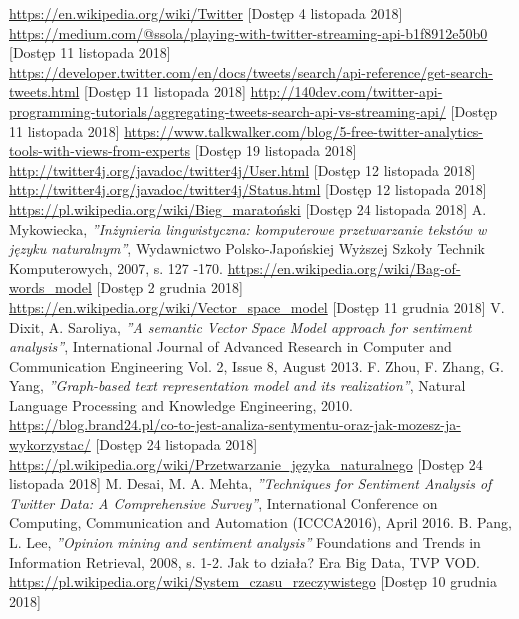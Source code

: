 \printbibliography
\clearpage
\begin{thebibliography}{99}
		\bibitem{[1]} 
		\url{https://en.wikipedia.org/wiki/Twitter} [Dostęp 4 listopada 2018]
		\bibitem{[2]}
		\url{https://medium.com/@ssola/playing-with-twitter-streaming-api-b1f8912e50b0} [Dostęp 11 listopada 2018]
		\bibitem{[3]}
		\url{https://developer.twitter.com/en/docs/tweets/search/api-reference/get-search-tweets.html} [Dostęp 11 listopada 2018]
		\bibitem{[4]}
		\url{http://140dev.com/twitter-api-programming-tutorials/aggregating-tweets-search-api-vs-streaming-api/} [Dostęp 11 listopada 2018]
		\bibitem{[5]}
		\url{https://www.talkwalker.com/blog/5-free-twitter-analytics-tools-with-views-from-experts} [Dostęp 19 listopada 2018]
		\bibitem{[6]}
		\url{http://twitter4j.org/javadoc/twitter4j/User.html} [Dostęp 12 listopada 2018]
		\bibitem{[7]}
		\url{http://twitter4j.org/javadoc/twitter4j/Status.html} [Dostęp 12 listopada 2018]
		\bibitem{[8]}
		\url{https://pl.wikipedia.org/wiki/Bieg_maratoński} [Dostęp 24 listopada 2018]
		\bibitem{[9]}
		A. Mykowiecka, \textit{''Inżynieria lingwistyczna: komputerowe przetwarzanie tekstów w języku naturalnym''}, Wydawnictwo Polsko-Japońskiej Wyższej Szkoły Technik Komputerowych, 2007, s. 127 -170.
		\bibitem{[10]}
		\url{https://en.wikipedia.org/wiki/Bag-of-words_model} [Dostęp 2 grudnia 2018]
		\bibitem{[11]}
		\url{https://en.wikipedia.org/wiki/Vector_space_model} [Dostęp 11 grudnia 2018]
		\bibitem{[12]}
		V. Dixit, A. Saroliya, \textit{''A semantic Vector Space Model approach for sentiment analysis''}, International Journal of Advanced Research in Computer and Communication Engineering
		Vol. 2, Issue 8, August 2013.
		\bibitem{[13]}
		F. Zhou, F. Zhang, G. Yang, \textit{''Graph-based text representation model and its realization''}, Natural Language Processing and Knowledge Engineering, 2010.
		\bibitem{[14]}
		\url{https://blog.brand24.pl/co-to-jest-analiza-sentymentu-oraz-jak-mozesz-ja-wykorzystac/} [Dostęp 24 listopada 2018]
		\bibitem{[15]}
		\url{https://pl.wikipedia.org/wiki/Przetwarzanie_języka_naturalnego} [Dostęp 24 listopada 2018]
		\bibitem{[16]}
		M. Desai, M. A. Mehta, \textit{''Techniques for Sentiment Analysis of Twitter Data: A Comprehensive Survey''}, International Conference on Computing, Communication and Automation (ICCCA2016), April 2016.
		\bibitem{[17]}
		B. Pang, L. Lee, \textit{''Opinion mining and sentiment analysis''} Foundations and Trends in Information Retrieval, 2008, s. 1-2.
		\bibitem{[18]}
		Jak to działa? Era Big Data, TVP VOD.
		\bibitem{[19]}
		\url{https://pl.wikipedia.org/wiki/System_czasu_rzeczywistego} [Dostęp 10 grudnia 2018]

\end{thebibliography}
